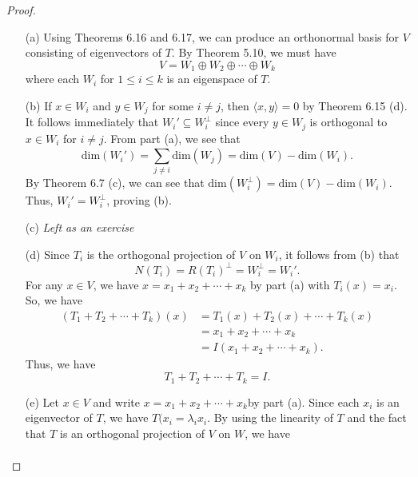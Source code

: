 \begin{proof}
\begin{enumerate}
    \item[(a)] Using Theorems 6.16 and 6.17, we can produce an orthonormal basis for \( V  \) consisting of eigenvectors of \( T  \). By Theorem 5.10, we must have
        \[  V = {W}_{1} \oplus {W}_{2} \oplus \cdots \oplus {W}_{k} \]
        where each \( {W}_{i} \) for \( 1 \leq i \leq k  \) is an eigenspace of \( T  \).
    \item[(b)] If \( x \in {W}_{i} \) and \( y \in {W}_{j} \) for some \( i \neq j  \), then \( \langle x , y \rangle = 0  \) by Theorem 6.15 (d). It follows immediately that \( {W}_{i}'  \subseteq {W}_{i}^{\perp}\) since every \( y \in {W}_{j} \) is orthogonal to \( x \in {W}_{i} \) for \( i \neq j \). From part (a), we see that
        \[  \text{dim}({W}_{i}') = \sum_{  j \neq i  }^{   } \text{dim}({W}_{j}) = \text{dim}(V) - \text{dim}({W}_{i}). \]
        By Theorem 6.7 (c), we can see that \( \text{dim}({W}_{i}^{\perp}) = \text{dim}(V) - \text{dim}({W}_{i}) \). Thus, \( {W}_{i}' =  {W}_{i}^{\perp} \), proving (b).
    \item[(c)] \textit{Left as an exercise} 
    \item[(d)] Since \( {T}_{i}  \) is the orthogonal projection of \( V  \) on \( {W}_{i} \), it follows from (b) that  
        \[  N({T}_{i}) = R({T}_{i})^{\perp} = {W}_{i}^{\perp} = {W}_{i}'. \]
        For any \( x \in V  \), we have \( x = {x}_{1} + {x}_{2} + \cdots + {x}_{k} \) by part (a) with \( {T}_{i}(x) = {x}_{i} \). So, we have
        \begin{align*}
            ({T}_{1} + {T}_{2} + \cdots + {T}_{k})(x) &= {T}_{1}(x) + {T}_{2}(x) + \cdots + {T}_{k}(x)  \\
                                                      &= {x}_{1} + {x}_{2} + \cdots + {x}_{k} \\
                                                      &= I({x}_{1} + {x}_{2} + \cdots + {x}_{k}).
        \end{align*}
        Thus, we have
        \[  {T}_{1} + {T}_{2} + \cdots + {T}_{k} = I.  \]
    \item[(e)] Let \( x \in V  \) and write \( x = {x}_{1} + {x}_{2} + \cdots + {x}_{k} \)by part (a). Since each \( {x}_{i} \) is an eigenvector of \( T  \), we have \( T({x}_{i} = {\lambda}_{i} {x}_{i}  \). By using the linearity of \( T  \) and the fact that \( T  \) is an orthogonal projection of \( V  \) on \( W  \), we have
        \begin{align*}

\end{align*}
\end{enumerate}
\end{proof}

